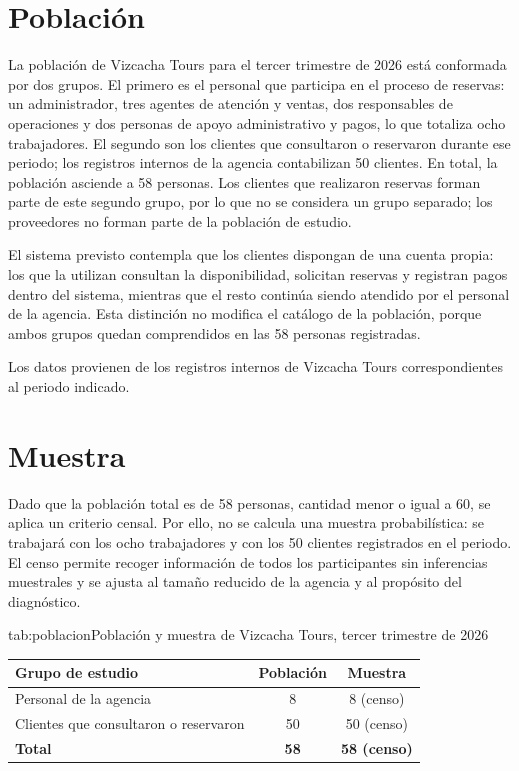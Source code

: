 \label{cap:poblacion}

\section*{Población}

La población de Vizcacha Tours para el tercer trimestre de 2026 está
conformada por dos grupos. El primero es el personal que participa en el
proceso de reservas: un administrador, tres agentes de atención y ventas, dos
responsables de operaciones y dos personas de apoyo administrativo y pagos, lo
que totaliza ocho trabajadores. El segundo son los clientes que consultaron o
reservaron durante ese periodo; los registros internos de la agencia
contabilizan 50 clientes. En total, la población asciende a 58 personas. Los
clientes que realizaron reservas forman parte de este segundo grupo, por lo
que no se considera un grupo separado; los proveedores no forman parte de la
población de estudio.

El sistema previsto contempla que los clientes dispongan de una cuenta propia:
los que la utilizan consultan la disponibilidad, solicitan reservas y registran
pagos dentro del sistema, mientras que el resto continúa siendo atendido por
el personal de la agencia. Esta distinción no modifica el catálogo de la
población, porque ambos grupos quedan comprendidos en las 58 personas
registradas.

Los datos provienen de los registros internos de Vizcacha Tours
correspondientes al periodo indicado.

\section*{Muestra}

Dado que la población total es de 58 personas, cantidad menor o igual a 60, se
aplica un criterio censal. Por ello, no se calcula una muestra probabilística:
se trabajará con los ocho trabajadores y con los 50 clientes registrados en el
periodo. El censo permite recoger información de todos los participantes sin
inferencias muestrales y se ajusta al tamaño reducido de la agencia y al
propósito del diagnóstico.

\begin{tablaapa}{tab:poblacion}{Población y muestra de Vizcacha Tours, tercer trimestre de 2026}
\begin{tabular}{@{}p{7.2cm}cc@{}}
\toprule
Grupo de estudio & Población & Muestra \\
\midrule
Personal de la agencia & 8 & 8 (censo) \\
Clientes que consultaron o reservaron & 50 & 50 (censo) \\
\midrule
\textbf{Total} & \textbf{58} & \textbf{58 (censo)} \\
\bottomrule
\end{tabular}
\end{tablaapa}
